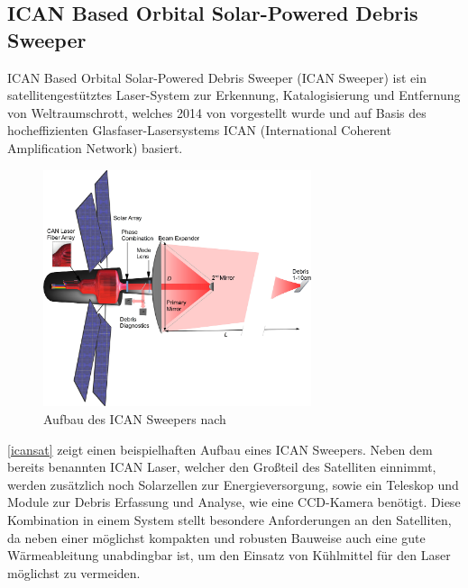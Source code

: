 \documentclass{article}
\begin{document}
\subsection{ICAN Based Orbital Solar-Powered Debris Sweeper}
ICAN Based Orbital Solar-Powered Debris Sweeper (ICAN Sweeper) ist ein satellitengestütztes Laser-System zur Erkennung, Katalogisierung und Entfernung von Weltraumschrott, welches 2014 von \citet{soulard2014ican} vorgestellt wurde und auf Basis des hocheffizienten Glasfaser-Lasersystems ICAN (International Coherent Amplification Network) basiert. 
\begin{figure}[H]
	\centering	\includegraphics[width = 0.7\textwidth]{images/ICAN_Satellit.jpg}
	\caption{Aufbau des ICAN Sweepers nach \citet{soulard2014ican}}
	\label{icansat}
\end{figure}
\noindent
\autoref{icansat} zeigt einen beispielhaften Aufbau eines ICAN Sweepers. Neben dem bereits benannten ICAN Laser, welcher den Großteil des Satelliten einnimmt, werden zusätzlich noch Solarzellen zur Energieversorgung, sowie ein Teleskop und Module zur Debris Erfassung und Analyse, wie eine CCD-Kamera benötigt. Diese Kombination in einem System stellt besondere Anforderungen an den Satelliten, da neben einer möglichst kompakten und robusten Bauweise auch eine gute Wärmeableitung unabdingbar ist, um den Einsatz von Kühlmittel für den Laser möglichst zu vermeiden. 
\end{document}
